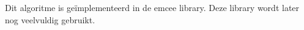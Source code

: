 Dit algoritme is geïmplementeerd in de emcee library\cite{unknown-author-no-date-emcee}. Deze library wordt later nog veelvuldig gebruikt.
















